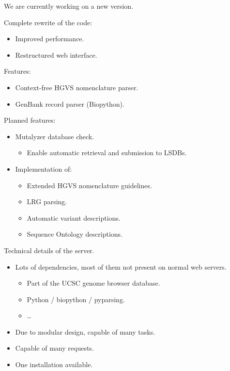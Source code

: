 \documentclass[a4, portrait]{seminar}
\begin{document}
\begin{slide}
We are currently working on a new version.

\vspace*{1cm}
Complete rewrite of the code:
\begin{itemize}
\item Improved performance.
\item Restructured web interface.
\end{itemize}

Features:
\begin{itemize}
\item Context-free HGVS nomenclature parser.
\item GenBank record parser (Biopython).
\end{itemize}
\vfill
\end{slide}

\begin{slide}
Planned features:
\begin{itemize}
\item Mutalyzer database check.
      \begin{itemize}
      \item Enable automatic retrieval and submission to LSDBs.
      \end{itemize}

\vspace*{1cm}
\item Implementation of:
      \begin{itemize}
      \item Extended HGVS nomenclature guidelines.
      \item LRG parsing.
      \item Automatic variant descriptions.
      \item Sequence Ontology descriptions.
      \end{itemize}
\end{itemize}
\vfill
\end{slide}

\begin{slide}
Technical details of the server.

\vspace*{1cm}
\begin{itemize}
\item Lots of dependencies, most of them not present on normal web servers.
      \begin{itemize}
      \item Part of the UCSC genome browser database.
      \item Python / biopython / pyparsing.
      \item \ldots
      \end{itemize}
\item Due to modular design, capable of many tasks.
\item Capable of many requests.
\item One installation available.
\end{itemize}
\vfill
\end{slide}
\end{document}
